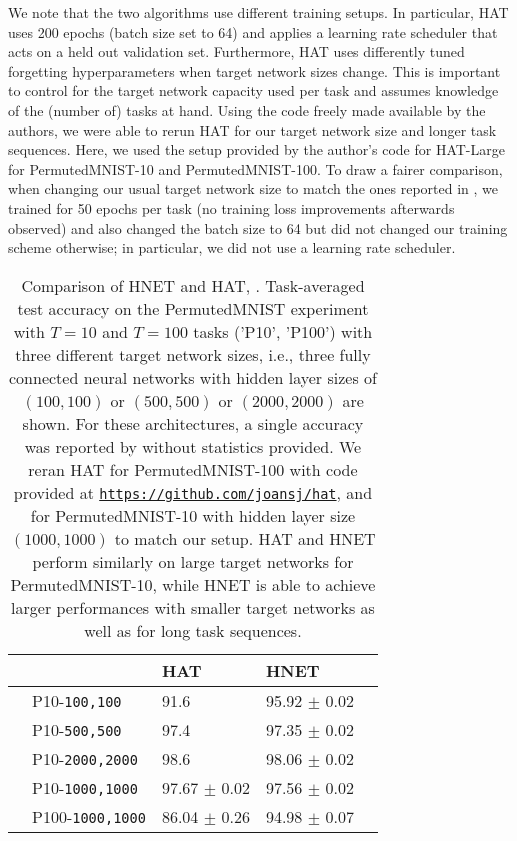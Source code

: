 \documentclass{article}
\begin{document}
We note that the two algorithms use different training setups. In particular, HAT uses 200 epochs (batch size set to 64) and applies a learning rate scheduler that acts on a held out validation set. Furthermore, HAT uses differently tuned forgetting hyperparameters when target network sizes change. This is important to control for the target network capacity used per task and assumes knowledge of the (number of) tasks at hand. Using the code freely made available by the authors, we were able to rerun HAT for our target network size and longer task sequences. Here, we used the setup provided by the author's code for HAT-Large for PermutedMNIST-10 and PermutedMNIST-100. 
To draw a fairer comparison, when changing our usual target network size to match the ones reported in \citet{pmlr-v80-serra18a}, we trained for 50 epochs per task (no training loss improvements afterwards observed) and also changed the batch size to 64 but did not changed our training scheme otherwise; in particular, we did not use a learning rate scheduler.

\begin{table*}[ht!]
 \centering
  \caption{Comparison of HNET and HAT, \citet{pmlr-v80-serra18a}. Task-averaged test accuracy on the PermutedMNIST experiment with $T=10$ and $T=100$ tasks ('P10', 'P100') with three different target network sizes, i.e., three fully connected neural networks with hidden layer sizes of $(100, 100)$ or $(500, 500)$ or $(2000, 2000)$ are shown. For these architectures, a single accuracy was reported by \citet{pmlr-v80-serra18a} without statistics provided. We reran HAT for PermutedMNIST-100 with code provided at \texttt{\href{https://github.com/joansj/hat}{https://github.com/joansj/hat}}, and for PermutedMNIST-10 with hidden layer size $(1000, 1000)$ to match our setup. HAT and HNET perform similarly on large target networks for PermutedMNIST-10, while HNET is able to achieve larger performances with smaller target networks as well as for long task sequences.}
  \begin{small}
  \begin{tabular}{llp{1.62cm}p{1.62cm}p{1.65cm}} \toprule
     & & \textbf{HAT} & \textbf{HNET} \\ \midrule \midrule
    \multirow{3}{*}{}
    & P10-\texttt{100,100} & 91.6  & 95.92 $\pm$  0.02  \\
    & P10-\texttt{500,500} & 97.4  & 97.35 $\pm$  0.02 \\
    & P10-\texttt{2000,2000} &  98.6  & 98.06 $\pm$  0.02 \\
    \midrule
    \multirow{3}{*}{} 
    & P10-\texttt{1000,1000} &  97.67 $\pm$ 0.02 & 97.56 $\pm$  0.02 \\
    & P100-\texttt{1000,1000} & 86.04 $\pm$  0.26 & 94.98 $\pm$  0.07 \\
    \bottomrule
  \end{tabular}
  \label{tab:hat_accs}
  \end{small}
\end{table*}
\end{document}
